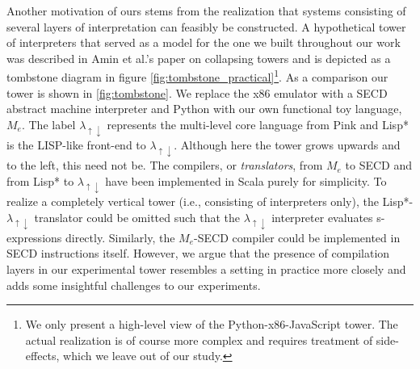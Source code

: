\documentclass[a4paper,12pt,twoside,openright]{report}
\theoremstyle{definition}
\newcommand{\mslang}{$\lambda_{\uparrow\downarrow}$}
\newcommand{\mevl}{$M_{e}$}
\begin{document}
Another motivation of ours stems from the realization that systems consisting of several layers of interpretation can feasibly be constructed. A hypothetical tower of interpreters that served as a model for the one we built throughout our work was described in Amin et al.'s paper on collapsing towers \cite{amin2017collapsing} and is depicted as a tombstone diagram in figure \ref{fig:tombstone_practical}\footnote{We only present a high-level view of the Python-x86-JavaScript tower. The actual realization is of course more complex and requires treatment of side-effects, which we leave out of our study.}. As a comparison our tower is shown in \ref{fig:tombstone}. We replace the x86 emulator with a SECD abstract machine interpreter and Python with our own functional toy language, \mevl. The label \mslang{} represents the multi-level core language from Pink \cite{amin2017collapsing} and Lisp* is the LISP-like front-end to \mslang. Although here the tower grows upwards and to the left, this need not be. The compilers, or \textit{translators}, from \mevl{} to SECD and from Lisp* to \mslang{} have been implemented in Scala purely for simplicity. To realize a completely vertical tower (i.e., consisting of interpreters only), the Lisp*-\mslang{} translator could be omitted such that the \mslang{} interpreter evaluates s-expressions directly. Similarly, the \mevl-SECD compiler could be implemented in SECD instructions itself. However, we argue that the presence of compilation layers in our experimental tower resembles a setting in practice more closely and adds some insightful challenges to our experiments.
\end{document}
